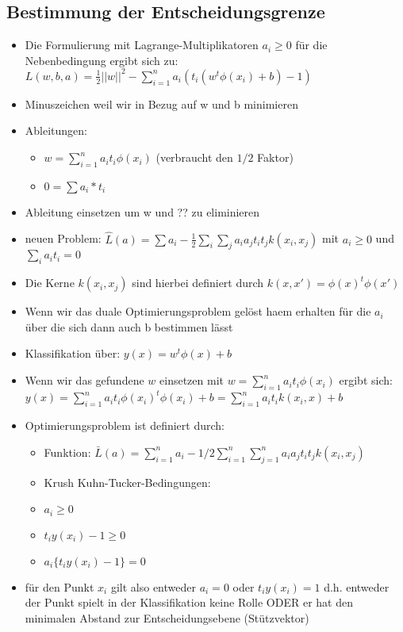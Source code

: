 \documentclass{article} %
\begin{document}
	\subsection{Bestimmung der Entscheidungsgrenze}
	\begin{itemize}
		\item Die Formulierung mit Lagrange-Multiplikatoren $a_i \geq 0$ für die Nebenbedingung ergibt sich zu: $L(w,b,a) = \frac{1}{2}||w||^2 - \sum_{i=1}^{n}a_i (t_i(w^t\phi(x_i)+b)-1)$
		\item Minuszeichen weil wir in Bezug auf w und b minimieren
		\item Ableitungen:
		\begin{itemize}
			\item $w = \sum_{i=1}^{n} a_i t_i \phi(x_i)$ (verbraucht den $1/2$ Faktor)
			\item $0 = \sum a_i*t_i$
		\end{itemize}
		\item Ableitung einsetzen um w und ?? zu eliminieren
		\item neuen Problem: $\hat{L}(a) = \sum a_i - \frac{1}{2}\sum_i\sum_j a_ia_jt_it_jk(x_i,x_j)$ mit $a_i \geq 0$ und $\sum_i a_it_i = 0$
		\item Die Kerne $k(x_i,x_j)$ sind hierbei definiert durch $k(x,x') = \phi(x)^t\phi(x')$
		\item Wenn wir das duale Optimierungsproblem gelöst haem erhalten für die $a_i$ über die sich dann auch b bestimmen lässt
		\item Klassifikation über: $y(x) = w^t\phi(x)+b$
		\item Wenn wir das gefundene $w$ einsetzen mit $w = \sum_{i=1}^{n}a_it_i\phi(x_i)$ ergibt sich: $y(x) =\sum_{i=1}^{n}a_it_i\phi(x_i)^t\phi(x_i) +b = \sum_{i=1}^{n}a_it_ik(x_i,x)+b$
		\item Optimierungsproblem ist definiert durch:
		\begin{itemize}
			\item Funktion: $\bar{L}(a) = \sum_{i=1}^{n}a_i-1/2\sum_{i=1}^{n}\sum_{j=1}^{n}a_ia_jt_it_jk(x_i,x_j)$
			\item Krush Kuhn-Tucker-Bedingungen:
			\item $a_i \geq0$
			\item $t_iy(x_i) -1 \geq 0$
			\item $a_i\{t_iy(x_i)-1\} = 0$
		\end{itemize}
		\item für den Punkt $x_i$ gilt also entweder $a_i = 0$ oder $t_iy(x_i) = 1$ d.h. entweder der Punkt spielt in der Klassifikation keine Rolle ODER er hat den minimalen Abstand zur Entscheidungsebene (Stützvektor)

\end{itemize}
\end{document}
